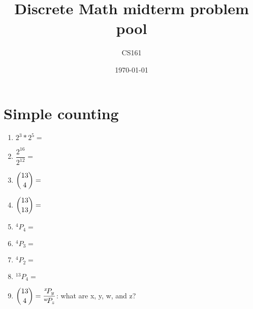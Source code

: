 \documentclass{article}
\title{Discrete Math midterm problem pool}
\date{\today}
\author{CS161}
\newcommand*{\Perm}[2]{{}^{#1}\!P_{#2}}%
\begin{document}
\maketitle


\section{Simple counting}
\begin{enumerate}
\item \( 2^3 * 2^5 = \)
\item \( \dfrac{2^{16}}{2^{12}} = \)
\item \( \dbinom{13}{4} = \)
\item \( \dbinom{13}{13} = \)
\item \( \Perm{4}{4} = \)
\item \( \Perm{4}{3} = \)
\item \( \Perm{4}{2} = \)
\item \( \Perm{13}{4} = \)
\item \( \dbinom{13}{4} = \dfrac{\Perm{x}{y}}{\Perm{w}{z}} \): what are x, y, w, and z?
\end{enumerate}
\end{document}
